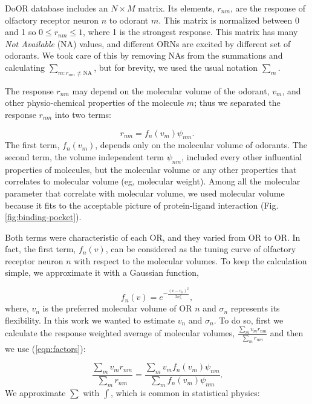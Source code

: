 \documentclass[11pt]{paper} %
\begin{document}
DoOR database includes an $N\times M$ matrix. 
Its elements, $r_{nm}$, are the response of olfactory receptor neuron $n$ to odorant $m$. 
This matrix is normalized between 0 and 1 so $0 \le r_{nm} \le 1$, where 1 is the strongest response.
This matrix has many {\it Not Available} (NA) values, 
and different ORNs are excited by different set of odorants. 
We took care of this by removing NAs from the summations and calculating $\sum_{m: r_{nm} \neq \text{NA}}$, 
but for brevity, we used the usual notation $\sum_m$.

The response $r_{nm}$ may depend on the molecular volume of the odorant, $v_m$, 
and other physio-chemical properties of the molecule $m$; 
thus we separated the response $r_{nm}$ into two terms:

\begin{equation}
	r_{nm} = f_n(v_m) \psi_{nm}.
	\label{eqn:factors}
\end{equation}
The first term, $f_n(v_m)$, depends only on the molecular volume of odorants.
The second term, the volume independent term $\psi_{nm}$, included every other influential properties of molecules, 
but the molecular volume or any other properties that correlates to molecular volume (eg, molecular weight).
Among all the molecular parameter that correlate with molecular volume, 
we used molecular volume because it fits to the acceptable picture of protein-ligand interaction (Fig. \ref{fig:binding-pocket}).

Both terms were characteristic of each OR, and they varied from OR to OR.
In fact, the first term, $f_n(v)$, can be considered as the tuning curve of olfactory receptor neuron $n$ with respect to the molecular volumes. 
To keep the calculation simple, we approximate it with a Gaussian function,  

\begin{equation}
	\displaystyle f_n(v) = e^{-\frac{(v-v_n)^2}{2\sigma^2_n}}, 
	\label{eqn:volume-dependence}
\end{equation}
where, $v_n$ is the preferred molecular volume of OR $n$ and $\sigma_n$ represents its flexibility. 
In this work we wanted to estimate $v_n$ and $\sigma_n$. 
To do so, first we calculate the response weighted average of molecular volumes, 
$\frac{\sum_{m} v_m r_{nm}}{\sum_{m} r_{nm}}$ and then we use (\ref{eqn:factors}):

\begin{equation}
	\frac{\displaystyle \sum_{m} v_m r_{nm}}{\displaystyle \sum_{m} r_{nm}} = \frac{\displaystyle \sum_{m} v_m f_n(v_m) \psi_{nm}}{\displaystyle \sum_{m} f_n(v_m) \psi_{nm}}.
	\label{eqn:sta}
\end{equation}
We approximate $\sum$ with $\int$, which is common in statistical physics:
\end{document}
